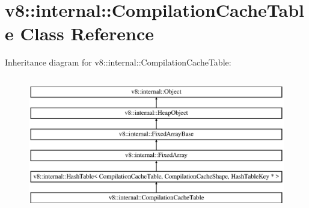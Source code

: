 \hypertarget{classv8_1_1internal_1_1_compilation_cache_table}{}\section{v8\+:\+:internal\+:\+:Compilation\+Cache\+Table Class Reference}
\label{classv8_1_1internal_1_1_compilation_cache_table}
Inheritance diagram for v8\+:\+:internal\+:\+:Compilation\+Cache\+Table\+:\begin{figure}[H]
\begin{center}
\leavevmode
\includegraphics[height=6.000000cm]{classv8_1_1internal_1_1_compilation_cache_table}
\end{center}
\end{figure}
